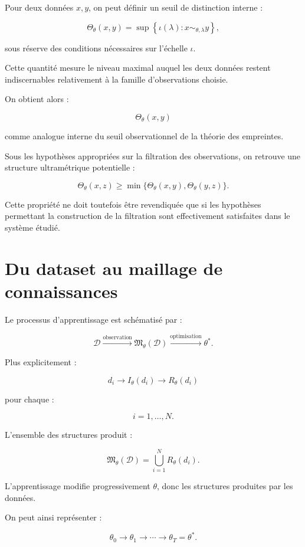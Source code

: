 \documentclass[11pt,a4paper]{article}
\newcommand{\D}{\mathcal D}
\begin{document}
Pour deux données $x,y$, on peut définir un seuil de distinction interne :

\[
\Theta_\theta(x,y)
=
\sup
\left\{
\iota(\lambda):
x\sim_{\theta,\lambda}y
\right\},
\]

sous réserve des conditions nécessaires sur l'échelle $\iota$.

Cette quantité mesure le niveau maximal auquel les deux données restent
indiscernables relativement à la famille d'observations choisie.

On obtient alors :

\[
\Theta_\theta(x,y)
\]

comme analogue interne du seuil observationnel de la théorie des empreintes.

Sous les hypothèses appropriées sur la filtration des observations, on
retrouve une structure ultramétrique potentielle :

\[
\Theta_\theta(x,z)
\geq
\min
\{
\Theta_\theta(x,y),
\Theta_\theta(y,z)
\}.
\]

Cette propriété ne doit toutefois être revendiquée que si les hypothèses
permettant la construction de la filtration sont effectivement satisfaites
dans le système étudié.

\section{Du dataset au maillage de connaissances}

Le processus d'apprentissage est schématisé par :

\[
\D
\xrightarrow{\text{observation}}
\mathfrak M_\theta(\D)
\xrightarrow{\text{optimisation}}
\theta^\ast.
\]

Plus explicitement :

\[
d_i
\longrightarrow
I_{\theta}(d_i)
\longrightarrow
R_\theta(d_i)
\]

pour chaque :

\[
i=1,\ldots,N.
\]

L'ensemble des structures produit :

\[
\mathfrak M_\theta(\D)
=
\bigcup_{i=1}^{N}R_\theta(d_i).
\]

L'apprentissage modifie progressivement $\theta$, donc les structures
produites par les données.

On peut ainsi représenter :

\[
\theta_0
\rightarrow
\theta_1
\rightarrow
\cdots
\rightarrow
\theta_T
=
\theta^\ast.
\]
\end{document}
